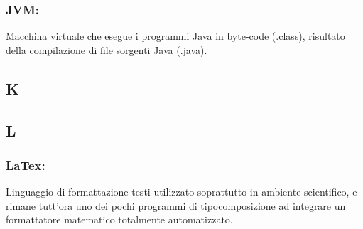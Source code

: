 \subsubsection*{JVM:} Macchina virtuale che esegue i programmi Java in byte-code
(.class), risultato della compilazione di file sorgenti Java (.java).

\subsection*{\huge{K}}
\subsection*{\huge{L}}
\subsubsection*{LaTex:} Linguaggio di formattazione testi utilizzato
soprattutto in ambiente scientifico, e rimane tutt'ora uno dei pochi programmi
di tipocomposizione ad integrare un formattatore matematico totalmente automatizzato.

